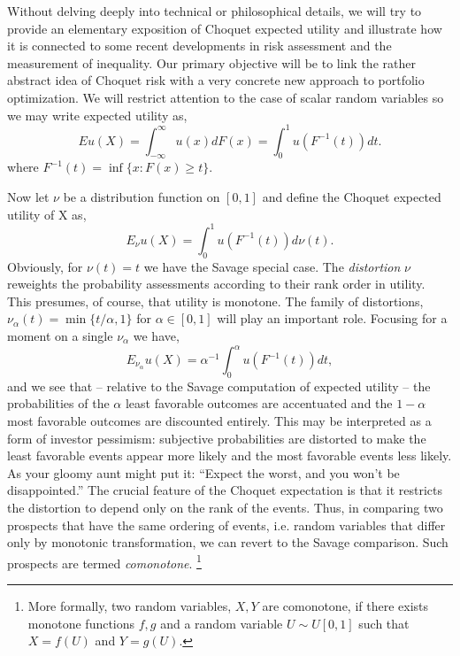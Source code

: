 \documentclass{birkart}
\theoremstyle{definition}
\theoremstyle{remark}
\numberwithin{equation}{section}
\begin{document}
Without delving deeply into technical or philosophical details, 
we will try to provide an elementary
exposition of Choquet expected utility and illustrate how it is connected
to some recent developments in risk assessment and the measurement of
inequality.  Our primary objective will be to link the rather abstract
idea of Choquet risk with a very concrete new approach to portfolio
optimization.  We will restrict attention to the case of scalar random
variables so we may write expected utility as,
\[
E u(X) = \int_{- \infty}^\infty u(x) dF(x) = \int_0^1 u(F^{-1}(t)) dt .
\]
where $F^{-1}(t) = \inf\{ x:  F(x) \geq t \}$.

Now let $\nu$ be a distribution function on $[0,1]$
and define the Choquet expected utility of X as,
\[
E_\nu u(X) = \int_0^1 u(F^{-1}(t)) d\nu (t) .
\]
Obviously, for $\nu(t)=t$ we have the Savage special case.  
The {\it distortion} $\nu$ reweights the probability assessments
according to their rank order in utility.  This presumes, of course,
that utility is monotone.
The family of distortions, $\nu_\alpha (t) = \min \{t/\alpha , 1\}$ for 
$\alpha  \in [0,1]$ will play an important role. Focusing for
a moment on a single $\nu_\alpha$ we have,
\[
E_{\nu_\alpha} u(X) = \alpha^{-1} \int_0^\alpha u(F^{-1}(t))dt,
\]
and we see that -- relative to the Savage
computation of expected utility -- the probabilities of the $\alpha$ least
favorable outcomes are accentuated and the $1-\alpha$ most favorable
outcomes are discounted entirely.  
This may be interpreted as a form of investor
pessimism:  subjective probabilities are distorted to make the least
favorable events appear more likely and the most favorable events less likely.
As your gloomy aunt might put it:
``Expect the worst, and you won't be disappointed.''
The crucial feature of the Choquet expectation is that it restricts
the distortion to depend only on the rank of the events.  
Thus, in comparing two prospects that have the same ordering of events, i.e. 
random variables that differ only by monotonic transformation, we can
revert to the Savage comparison. 
Such prospects are termed {\it comonotone}. \footnote{More formally, 
two random variables, $X,Y$ are comonotone, if there exists
monotone functions $f,g$ and a random variable $U \sim U[0,1]$ such that
$X = f(U)$ and $Y = g(U)$. } 
\end{document}
